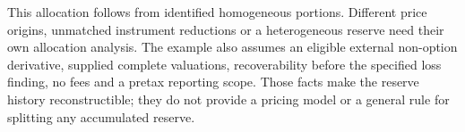 This allocation follows from identified homogeneous portions. Different
price origins, unmatched instrument reductions or a heterogeneous reserve
need their own allocation analysis. The example also assumes an eligible
external non-option derivative, supplied complete valuations, recoverability
before the specified loss finding, no fees and a pretax reporting scope.
Those facts make the reserve history reconstructible; they do not provide
a pricing model or a general rule for splitting any accumulated reserve.
